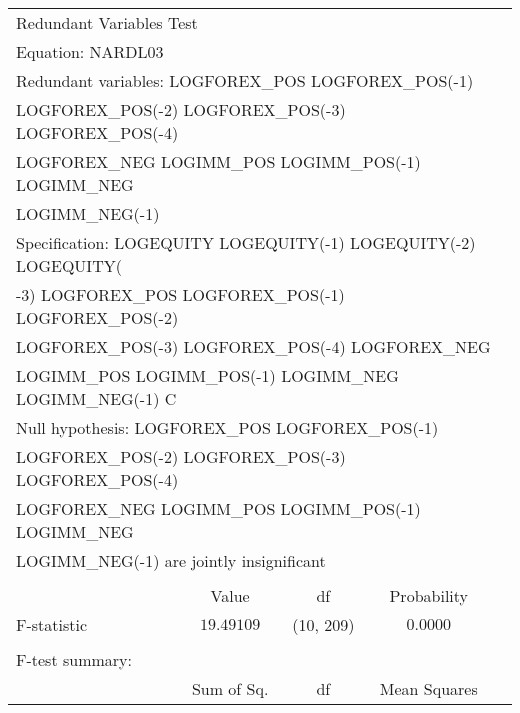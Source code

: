 \begin{tabular}{lrrrr}
\multicolumn{2}{l}{Redundant Variables Test}&\multicolumn{1}{c}{}&\multicolumn{1}{c}{}&\multicolumn{1}{c}{}\\
\multicolumn{1}{l}{Equation: NARDL03}&\multicolumn{1}{c}{}&\multicolumn{1}{c}{}&\multicolumn{1}{c}{}&\multicolumn{1}{c}{}\\
\multicolumn{5}{l}{Redundant variables: LOGFOREX\_POS LOGFOREX\_POS(-1)}\\
\multicolumn{6}{l}{LOGFOREX\_POS(-2) LOGFOREX\_POS(-3) LOGFOREX\_POS(-4)}\\
\multicolumn{6}{l}{LOGFOREX\_NEG LOGIMM\_POS LOGIMM\_POS(-1) LOGIMM\_NEG}\\
\multicolumn{2}{l}{LOGIMM\_NEG(-1)}&\multicolumn{1}{c}{}&\multicolumn{1}{c}{}&\multicolumn{1}{c}{}\\
\multicolumn{6}{l}{Specification: LOGEQUITY LOGEQUITY(-1) LOGEQUITY(-2) LOGEQUITY(}\\
\multicolumn{6}{l}{-3) LOGFOREX\_POS LOGFOREX\_POS(-1) LOGFOREX\_POS(-2)}\\
\multicolumn{5}{l}{LOGFOREX\_POS(-3) LOGFOREX\_POS(-4) LOGFOREX\_NEG}\\
\multicolumn{6}{l}{LOGIMM\_POS LOGIMM\_POS(-1) LOGIMM\_NEG LOGIMM\_NEG(-1) C}\\
\multicolumn{5}{l}{Null hypothesis: LOGFOREX\_POS LOGFOREX\_POS(-1)}\\
\multicolumn{6}{l}{LOGFOREX\_POS(-2) LOGFOREX\_POS(-3) LOGFOREX\_POS(-4)}\\
\multicolumn{6}{l}{LOGFOREX\_NEG LOGIMM\_POS LOGIMM\_POS(-1) LOGIMM\_NEG}\\
\multicolumn{4}{l}{LOGIMM\_NEG(-1)   are jointly insignificant}&\multicolumn{1}{c}{}\\
[4.5pt] \hline \\ [-4.5pt]
\multicolumn{1}{c}{}&\multicolumn{1}{c}{Value}&\multicolumn{1}{c}{df}&\multicolumn{1}{c}{Probability}&\multicolumn{1}{c}{}\\
\multicolumn{1}{l}{F-statistic}&\multicolumn{1}{c}{$19.49109$}&\multicolumn{1}{c}{(10, 209)}&\multicolumn{1}{c}{$0.0000$}&\multicolumn{1}{c}{}\\
[4.5pt] \hline \\ [-4.5pt]
\multicolumn{1}{l}{F-test summary:}&\multicolumn{1}{c}{}&\multicolumn{1}{c}{}&\multicolumn{1}{c}{}&\multicolumn{1}{c}{}\\
\multicolumn{1}{c}{}&\multicolumn{1}{c}{Sum of Sq.}&\multicolumn{1}{c}{df}&\multicolumn{1}{c}{Mean Squares}&\multicolumn{1}{c}{}\\

\end{tabular}
